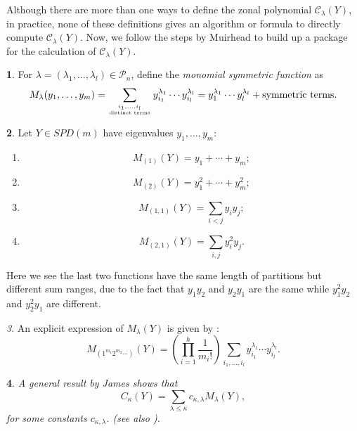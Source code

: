 \documentclass[10pt,oneside,american]{amsart}
\numberwithin{equation}{section}
\numberwithin{figure}{section}
\theoremstyle{plain}
\newtheorem{thm}{\protect\theoremname}[section]
\theoremstyle{definition}
\newtheorem{defn}[thm]{\protect\definitionname}
\theoremstyle{remark}
\newtheorem{rem}[thm]{\protect\remarkname}
\theoremstyle{plain}
\theoremstyle{definition}
\newtheorem{example}[thm]{\protect\examplename}
\theoremstyle{plain}
\theoremstyle{plain}
\providecommand{\definitionname}{Definition}
\providecommand{\examplename}{Example}
\providecommand{\remarkname}{Remark}
\providecommand{\theoremname}{Theorem}
\begin{document}
Although there are more than one ways to define the zonal polynomial $\mathcal{C}_{\lambda}(Y)$,
in practice, none of these definitions gives an algorithm or formula
to directly compute $\mathcal{C}_{\lambda}(Y)$. Now, we
follow the steps by Muirhead \cite{Muirhead} to build up a package for the
calculation of $\mathcal{C}_{\lambda}(Y)$.
\begin{defn}
For $\lambda=\left(\lambda_{1},\ldots,\lambda_{l}\right)\in\mathcal{P}_{n}$,
define the \emph{monomial symmetric function} as 
\begin{equation}
M_{\lambda}(y_{1},\ldots,y_{m})=\sum_{\genfrac{}{}{0pt}{}{i_{1},\ldots,i_{l}}{\text{distinct terms}}}y_{i_{1}}^{\lambda_{1}}\cdots y_{i_{l}}^{\lambda_{l}}=y_{1}^{\lambda_{1}}\cdots y_{l}^{\lambda_{l}}+\text{symmetric terms}.\label{eq:MZonal}
\end{equation}
\end{defn}
\begin{example}
Let $Y\in SPD(m)$ have eigenvalues $y_{1},\ldots,y_{m}$:
\begin{enumerate}
\item 
\[
M_{\left(1\right)}(Y)=y_{1}+\cdots+y_{m};
\]
\item 
\[
M_{\left(2\right)}(Y)=y_{1}^{2}+\cdots+y_{m}^{2};
\]
\item \label{enu:ILessThanJ}
\[
M_{\left(1,1\right)}(Y)=\underset{i<j}{\sum}y_{i}y_{j};
\]
\item \label{enu:IANDJ}
\[
M_{\left(2,1\right)}(Y)=\underset{i,j}{\sum}y_{i}^{2}y_{j}.
\]
\end{enumerate}
Here we see the last two functions have the same length of partitions
but different sum ranges, due to the fact that $y_{1}y_{2}$ and $y_{2}y_{1}$
are the same while $y_{1}^{2}y_{2}$ and $y_{2}^{2}y_{1}$ are different. 
\end{example}
\begin{rem}
An explicit expression of $M_{\lambda}(Y)$ is given by
\cite[eq.~6, p.~11]{Takemura}:
\begin{equation}
M_{\left(1^{m_{1}}2^{m_{2}}\cdots\right)}\left(Y\right)=\left(\prod_{i=1}^{h}\frac{1}{m_{i}!}\right)\sum_{i_{1},\ldots,i_{l}}y_{i_{1}}^{\lambda_{1}}\cdots y_{i_{l}}^{\lambda_{l}}.\label{eq:MZonalComputation}
\end{equation}
\end{rem}
\begin{thm}
A general result by James \cite{James1} shows that
\begin{equation}
C_{\kappa}(Y)=\sum_{\lambda\leq\kappa}c_{\kappa,\lambda}M_{\lambda}(Y),\label{eq:CInTermsOfM}
\end{equation}
 for some constants $c_{\kappa,\lambda}$. (see also \cite[eq.~13, p.~234]{Muirhead}).
\end{thm}
\end{document}
